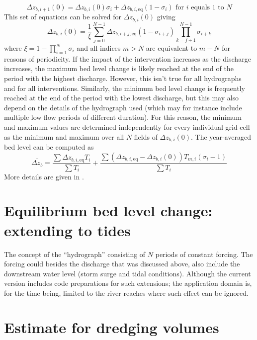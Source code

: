 %
\begin{equation}
\Delta z_{b,i+1}(0) = \Delta z_{b,i}(0) \sigma_i + \Delta z_{b,i,\text{eq}} (1-\sigma_i) \text{ for $i$ equals 1 to $N$}
\label{Eq:zbiNPeriods}
\end{equation}
%
This set of equations can be solved for $\Delta z_{b,i}(0)$ giving
%
\begin{equation}
\Delta z_{b,i}(0) = \frac{1}{\xi} \sum_{j=0}^{N-1} \Delta z_{b,i+j,\text{eq}} (1-\sigma_{i+j}) \prod_{k=j+1}^{N-1} \sigma_{i+k}
\end{equation}
%
where $\xi = 1 - \prod_{i=1}^N \sigma_i$ and all indices $m>N$ are equivalent to $m-N$ for reasons of periodicity.
If the impact of the intervention increases as the discharge increases, the maximum bed level change is likely reached at the end of the period with the highest discharge.
However, this isn't true for all hydrographs and for all interventions.
Similarly, the minimum bed level change is frequently reached at the end of the period with the lowest discharge, but this may also depend on the details of the hydrograph used (which may for instance include multiple low flow periods of different duration).
For this reason, the minimum and maximum values are determined independently for every individual grid cell as the minimum and maximum over all $N$ fields of $\Delta z_{b,i}(0)$.
The year-averaged bed level can be computed as
%
\begin{equation}
\bar{\Delta z_b} = \frac{\sum{\Delta z_{b,i,\text{eq}} T_i}}{\sum{T_i}} + \frac{\sum{(\Delta z_{b,i,\text{eq}} - \Delta z_{b,i}(0)) T_{m,i} (\sigma_i-1)}}{\sum{T_i}}
\label{Eq:zbMean}
\end{equation}
%
More details are given in \citet{JagersGiri2022}.


\section{Equilibrium bed level change: extending to tides}\label{Sec:Tides}

The concept of the ``hydrograph'' consisting of $N$ periods of constant forcing.
The forcing could besides the discharge that was discussed above, also include the downstream water level (storm surge and tidal conditions).
Although the current \dfastmi version includes code preparations for such extensions; the application domain is, for the time being, limited to the river reaches where such effect can be ignored.


\section{Estimate for dredging volumes}\label{Sec:DredgeVol}

